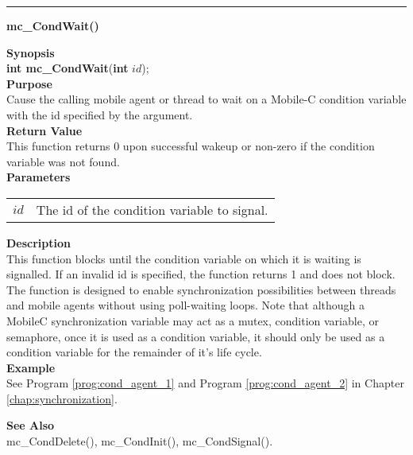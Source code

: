 \noindent
\vspace{5pt}
\rule{6.5in}{0.015in}
\noindent
{}
{\LARGE \bf mc\_CondWait()}\\

\noindent
{\bf Synopsis}\\
{\bf int mc\_CondWait}({\bf int} $id$);\\

\noindent
{\bf Purpose}\\
Cause the calling mobile agent or thread to wait on a Mobile-C 
condition variable with the id specified by the argument.\\

\noindent
{\bf Return Value}\\
This function returns 0 upon successful wakeup or non-zero if the condition 
variable was not found. \\

\noindent
{\bf Parameters}
\vspace{-0.1pt}
\begin{description}
\item
\begin{tabular}{p{10 mm}p{145 mm}}
$id$ & The id of the condition variable to signal.
\end{tabular} 
\end{description}

\noindent
{\bf Description}\\
This function blocks until the condition variable on which it is waiting is 
signalled.
If an invalid id is specified, the function returns 1 and does not block.
The function is designed to enable synchronization possibilities between 
threads and mobile agents without using poll-waiting loops.
Note that although a MobileC synchronization variable may act as a mutex, 
condition variable, or semaphore, once it is used as a condition variable,
it should only be used as a condition variable for the remainder of it's 
life cycle.\\

\noindent
{\bf Example}\\
See Program \vref{prog:cond_agent_1} and Program
\vref{prog:cond_agent_2} in Chapter \ref{chap:synchronization}.\\
\noindent

\noindent
{\bf See Also}\\
mc\_CondDelete(), mc\_CondInit(), mc\_CondSignal().\\

